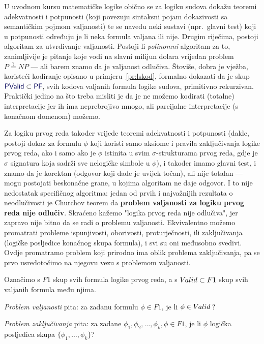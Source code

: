 U uvodnom kursu matematičke logike obično se za logiku sudova dokažu teoremi adekvatnosti i potpunosti (koji povezuju sintaksni pojam dokazivosti sa semantičkim pojmom valjanosti) te se navedu neki sustavi (npr.\ glavni test) koji u potpunosti određuju je li neka formula valjana ili nije. Drugim riječima, postoji algoritam za utvrđivanje valjanosti. Postoji li \emph{polinomni} algoritam za to, zanimljivije je pitanje koje vodi na slavni milijun dolara vrijedan problem $P\stackrel?=NP$ --- ali barem znamo da je valjanost odlučiva. Štoviše, dobra je vježba, koristeći kodiranje opisano u primjeru~\ref{pr:lskod}, formalno dokazati da je skup $\f{PValid}\subset\f{PF}$, svih kodova valjanih formula logike sudova, primitivno rekurzivan. Praktički jedino na što treba misliti je da je ne možemo kodirati (totalne) interpretacije jer ih ima neprebrojivo mnogo, ali parcijalne interpretacije (s konačnom domenom) možemo.

Za logiku prvog reda također vrijede teoremi adekvatnosti i potpunosti (dakle, postoji dokaz za formulu $\phi$ koji koristi samo aksiome i pravila zaključivanja logike prvog reda, ako i samo ako je $\phi$ istinita u svim $\sigma$-strukturama prvog reda, gdje je $\sigma$ signatura koja sadrži sve nelogičke simbole u $\phi$), i također imamo glavni test, i znamo da je korektan (odgovor koji dade je uvijek točan), ali nije totalan --- mogu postojati beskonačne grane, u kojima algoritam ne daje odgovor. I to nije nedostatak specifičnog algoritma: jedan od prvih i najvažnijih rezultata o neodlučivosti je Churchov teorem da \textbf{problem valjanosti za logiku prvog reda nije odlučiv}. Skraćeno kažemo "logika prvog reda nije odlučiva", jer zapravo nije bitno da se radi o problemu valjanosti. Ekvivalentno možemo promatrati probleme ispunjivosti, oborivosti, proturječnosti, ili zaključivanja (logičke posljedice konačnog skupa formula), i svi su oni međusobno svedivi. Ovdje promatramo problem koji prirodno ima oblik problema zaključivanja, pa se prvo usredotočimo na njegovu vezu s problemom valjanosti.

\begin{definicija}[{name=[problem valjanosti i problem zaključivanja]}]
    Označimo s $F1$ skup svih formula logike prvog reda,\newline
	\hspace*{6.1em}
	a s $V\mspace{-1.5mu}alid\subset F1$ skup svih valjanih formula među njima.

	\emph{Problem valjanosti} pita: za zadanu formulu $\phi\in F1$, je li $\phi\in V\mspace{-1.5mu}alid\mspace{2mu}$?

\emph{Problem zaključivanja} pita: za zadane $\phi_1,\phi_2,\dotsc,\phi_k,\phi\in F1$,\newline
	\hspace*{14.1em}je li $\phi$ logička posljedica skupa $\{\phi_1,\dotsc,\phi_k\}$?
\end{definicija}

